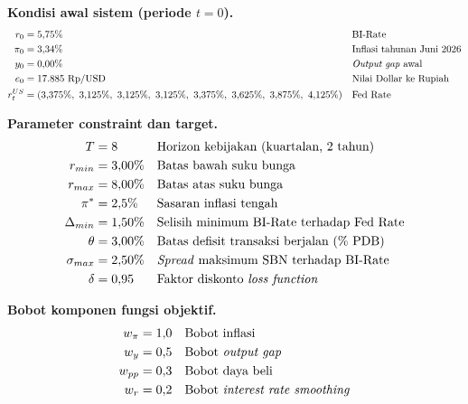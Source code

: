 \medskip
\noindent\textbf{Kondisi awal sistem (periode $t = 0$).}
\begin{align*}
    r_0      & = 5{,}75\%                                                                                        &  & \text{BI-Rate}                   \\
    \pi_0    & = 3{,}34\%                                                                                        &  & \text{Inflasi tahunan Juni 2026} \\
    y_0      & = 0{,}00\%                                                                                        &  & \text{\textit{Output gap} awal}  \\
    e_0      & = 17{.}885\ \text{Rp/USD}                                                                         &  & \text{Nilai Dollar ke Rupiah}    \\
    r_t^{US} & = (3{,}375\%,\ 3{,}125\%,\ 3{,}125\%,\ 3{,}125\%,\ 3{,}375\%,\ 3{,}625\%,\ 3{,}875\%,\ 4{,}125\%) &  & \text{Fed Rate}
\end{align*}

\medskip
\noindent\textbf{Parameter constraint dan target.}
\begin{align*}
    T            & = 8        &  & \text{Horizon kebijakan (kuartalan, 2 tahun)}        \\
    r_{min}      & = 3{,}00\% &  & \text{Batas bawah suku bunga}                        \\
    r_{max}      & = 8{,}00\% &  & \text{Batas atas suku bunga}                         \\
    \pi^{*}      & = 2{,}5\%  &  & \text{Sasaran inflasi tengah}                        \\
    \Delta_{min} & = 1{,}50\% &  & \text{Selisih minimum BI-Rate terhadap Fed Rate}     \\
    \theta       & = 3{,}00\% &  & \text{Batas defisit transaksi berjalan (\% PDB)}     \\
    \sigma_{max} & = 2{,}50\% &  & \text{\textit{Spread} maksimum SBN terhadap BI-Rate} \\
    \delta       & = 0{,}95   &  & \text{Faktor diskonto \textit{loss function}}
\end{align*}

\medskip
\noindent\textbf{Bobot komponen fungsi objektif.}
\begin{align*}
    w_{\pi} & = 1{,}0 &  & \text{Bobot inflasi}                          \\
    w_{y}   & = 0{,}5 &  & \text{Bobot \textit{output gap}}              \\
    w_{pp}  & = 0{,}3 &  & \text{Bobot daya beli}                        \\
    w_{r}   & = 0{,}2 &  & \text{Bobot \textit{interest rate smoothing}}
\end{align*}


